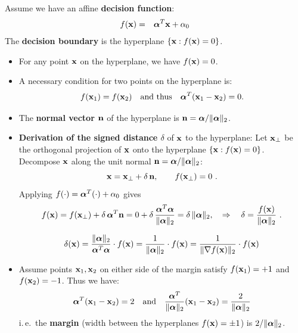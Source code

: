   Assume we have an affine \textbf{decision function}:
  \begin{eqnarray*}
    f(\bm{\mathrm{x}}) &=& \bm{\mathrm{\alpha}}^T \bm{\mathrm{x}} + \alpha_0
  \end{eqnarray*}
  The \textbf{decision boundary} is the hyperplane $\{\bm{\mathrm{x}} : f(\bm{\mathrm{x}})=0\}$.
  \begin{itemize}
    \item For any point $\bm{\mathrm{x}}$ on the hyperplane, we have $f(\bm{\mathrm{x}})= 0$.      
    \item A necessary condition for two points on the hyperplane is:
      \begin{displaymath}
        f(\bm{\mathrm{x}}_1) = f(\bm{\mathrm{x}}_2) \quad \mbox{and thus} \quad \bm{\mathrm{\alpha}}^T (\bm{\mathrm{x}}_1-\bm{\mathrm{x}}_2) =0.
      \end{displaymath}
    \item The  \textbf {normal vector $\bm{\mathrm{n}}$} of the hyperplane is $\bm{\mathrm{n}}= \bm{\mathrm{\alpha}}/\|\bm{\mathrm{\alpha}}\|_2$.

    \item \textbf{Derivation of the signed distance $\delta$} of $\bm{\mathrm{x}}$ to the hyperplane: Let $\bm{\mathrm{x}}_\perp$ be the orthogonal projection of $\bm{\mathrm{x}}$ onto the hyperplane $\{\bm{\mathrm{x}}:f(\bm{\mathrm{x}})=0\}$.
          Decompose $\bm{\mathrm{x}}$ along the unit normal $\bm{\mathrm{n}}=\bm{\mathrm{\alpha}}/\|\bm{\mathrm{\alpha}}\|_2$:
          {\small
          \[
            \bm{\mathrm{x}} = \bm{\mathrm{x}}_\perp + \delta\,\bm{\mathrm{n}}, \qquad f(\bm{\mathrm{x}}_\perp)=0~.
          \]
          }
          Applying $f(\cdot)=\bm{\mathrm{\alpha}}^T(\cdot)+\alpha_0$ gives
          {\small
          \[
            f(\bm{\mathrm{x}})=f(\bm{\mathrm{x}}_\perp)+\delta\,\bm{\mathrm{\alpha}}^T\bm{\mathrm{n}}
            = 0 + \delta\,\frac{\bm{\mathrm{\alpha}}^T\bm{\mathrm{\alpha}}}{\|\bm{\mathrm{\alpha}}\|_2}
            = \delta\,\|\bm{\mathrm{\alpha}}\|_2,
            \quad\Rightarrow\quad \delta=\frac{f(\bm{\mathrm{x}})}{\|\bm{\mathrm{\alpha}}\|_2}~.
          \]
          }

      \begin{displaymath}
        \delta(\bm{\mathrm{x}}) = 
        \frac{\|\bm{\mathrm{\alpha}}\|_2}{\bm{\mathrm{\alpha}}^T\bm{\mathrm{\alpha}}} \cdot f(\bm{\mathrm{x}}) = 
        \frac{1}{\|\bm{\mathrm{\alpha}}\|_2}\cdot f(\bm{\mathrm{x}})  =
        \frac{1}{\|\nabla f(\bm{\mathrm{x}})\|_2}\cdot f(\bm{\mathrm{x}})  
      \end{displaymath}

    \item Assume points $\bm{\mathrm{x}}_1, \bm{\mathrm{x}}_2$ on either side of the margin satisfy $f(\bm{\mathrm{x}}_1)= +1$ and $f(\bm{\mathrm{x}}_2)=-1$. Thus we have:
      \begin{displaymath}
        \bm{\mathrm{\alpha}}^T (\bm{\mathrm{x}}_1 - \bm{\mathrm{x}}_2) = 2 \quad \mbox{and} \quad
        \frac{\bm{\mathrm{\alpha}}^T}{\|\bm{\mathrm{\alpha}}\|_2} (\bm{\mathrm{x}}_1-\bm{\mathrm{x}}_2) 
        = \frac{2}{\|\bm{\mathrm{\alpha}}\|_2}
      \end{displaymath}
      i.\,e.\ the \textbf{margin} (width between the hyperplanes $f(\bm{\mathrm{x}})=\pm 1$) is $2/\|\bm{\mathrm{\alpha}}\|_2$.
  \end{itemize}
  
